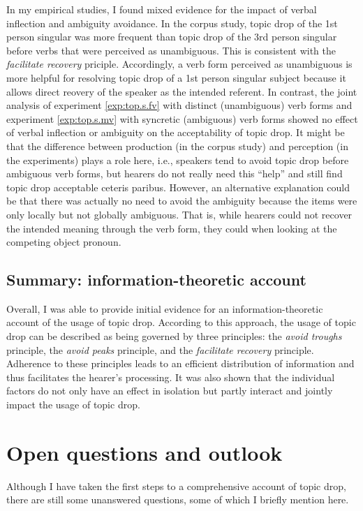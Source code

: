 In my empirical studies, I found mixed evidence for the impact of verbal inflection and ambiguity avoidance.
In the corpus  study, topic drop of the 1st person singular was more frequent than topic drop of the 3rd person singular before verbs that were perceived as unambiguous.
This is consistent with the \textit{facilitate recovery} priciple. 
Accordingly, a verb form perceived as unambiguous is more helpful for resolving topic drop of a 1st person singular subject because it allows direct reovery of  the speaker as the intended referent.
In contrast, the joint analysis of experiment \ref*{exp:top.s.fv} with distinct (unambiguous) verb forms and experiment \ref*{exp:top.s.mv} with syncretic  (ambiguous) verb forms showed no effect of verbal inflection or ambiguity on the acceptability of topic drop.
It might be that the difference between production  (in the corpus  study) and perception (in the experiments) plays a role here, i.e., speakers tend to avoid topic drop before ambiguous verb forms, but hearers do not really need this ``help'' and still find topic drop acceptable ceteris paribus.
However, an alternative explanation could be that there was actually no need to avoid the ambiguity because the items were only locally but not globally ambiguous.
That is, while hearers could not recover  the intended meaning through the verb form, they could when looking at the competing object pronoun. 
 

\subsection{Summary: information-theoretic account}
Overall, I was able to provide initial evidence for an information-theoretic account of the usage of topic drop.
According to this approach, the usage of topic drop can be described as being governed by three principles: the \textit{avoid troughs} principle, the \textit{avoid peaks} principle, and the \textit{facilitate recovery} principle. 
Adherence to these principles leads to an efficient distribution of information  and thus facilitates the hearer's processing.
It was also shown that the individual factors do not only have an effect in isolation but partly interact and jointly impact the usage of topic drop.

\section{Open questions and outlook}
Although I have taken the first steps to a comprehensive account of topic drop, there are still some unanswered questions, some of which I briefly mention here.

